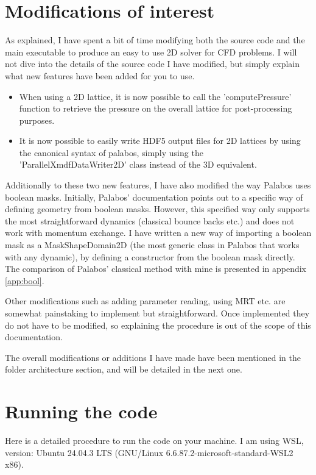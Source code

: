 \documentclass{article}
\begin{document}
\section{Modifications of interest}

As explained, I have spent a bit of time modifying both the source code and the main executable to produce an easy to use 2D solver for CFD problems. I will not dive into the details of the source code I have modified, but simply explain what new features have been added for you to use.

\begin{itemize}
    \item When using a 2D lattice, it is now possible to call the 'computePressure' function to retrieve the pressure on the overall lattice for post-processing purposes. 
    \item It is now possible to easily write HDF5 output files for 2D lattices by using the canonical syntax of palabos, simply using the 'ParallelXmdfDataWriter2D' class instead of the 3D equivalent.
\end{itemize}

Additionally to these two new features, I have also modified the way Palabos uses boolean masks. Initially, Palabos' documentation points out to a specific way of defining geometry from boolean masks. However, this specified way only supports the most straightforward dynamics (classical bounce backs etc.) and does not work with momentum exchange. I have written a new way of importing a boolean mask as a MaskShapeDomain2D (the most generic class in Palabos that works with any dynamic), by defining a constructor from the boolean mask directly. The comparison of Palabos' classical method with mine is presented in appendix \ref{app:bool}.

Other modifications such as adding parameter reading, using MRT etc. are somewhat painstaking to implement but straightforward. Once implemented they do not have to be modified, so explaining the procedure is out of the scope of this documentation.

The overall modifications or additions I have made have been mentioned in the folder architecture section, and will be detailed in the next one.

\section{Running the code}

Here is a detailed procedure to run the code on your machine.
I am using WSL, version:  Ubuntu 24.04.3 LTS (GNU/Linux 6.6.87.2-microsoft-standard-WSL2 x86).
\end{document}
